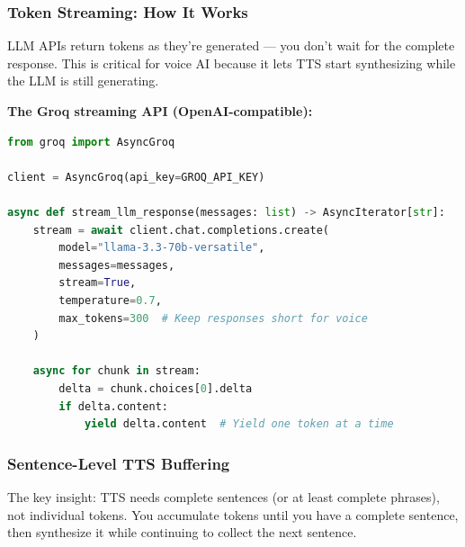 \documentclass[
  11pt,
]{article}
\begin{document}
\hypertarget{token-streaming-how-it-works}{%
\subsubsection{Token Streaming: How It
Works}\label{token-streaming-how-it-works}}

LLM APIs return tokens as they're generated --- you don't wait for the
complete response. This is critical for voice AI because it lets TTS
start synthesizing while the LLM is still generating.

\textbf{The Groq streaming API (OpenAI-compatible):}

\begin{lstlisting}[language=Python]
from groq import AsyncGroq

client = AsyncGroq(api_key=GROQ_API_KEY)

async def stream_llm_response(messages: list) -> AsyncIterator[str]:
    stream = await client.chat.completions.create(
        model="llama-3.3-70b-versatile",
        messages=messages,
        stream=True,
        temperature=0.7,
        max_tokens=300  # Keep responses short for voice
    )
    
    async for chunk in stream:
        delta = chunk.choices[0].delta
        if delta.content:
            yield delta.content  # Yield one token at a time
\end{lstlisting}

\hypertarget{sentence-level-tts-buffering}{%
\subsubsection{Sentence-Level TTS
Buffering}\label{sentence-level-tts-buffering}}

The key insight: TTS needs complete sentences (or at least complete
phrases), not individual tokens. You accumulate tokens until you have a
complete sentence, then synthesize it while continuing to collect the
next sentence.
\end{document}
